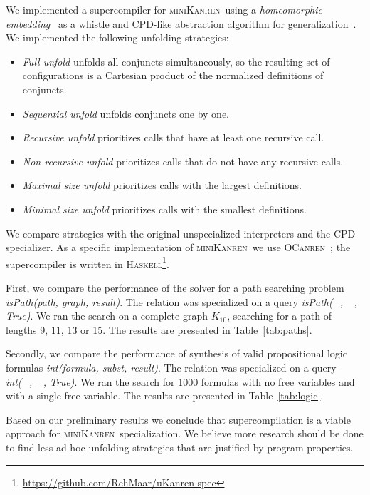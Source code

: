 \documentclass[submission,copyright,creativecommons]{eptcs}
\newcommand{\miniKanren}{\textsc{miniKanren}\ }
\begin{document}
We implemented a supercompiler for \miniKanren using a {\it homeomorphic embedding}~\cite{homeoEmb} as a whistle
and CPD-like abstraction algorithm for generalization~\cite{cpd}.
We implemented the following unfolding strategies:
\begin{itemize}
\item {\it Full unfold} unfolds all conjuncts simultaneously, so
      the resulting set of configurations is a Cartesian product of the normalized definitions of conjuncts.
\item {\it Sequential unfold} unfolds conjuncts one by one.
\item {\it Recursive unfold}     prioritizes calls that have at least one recursive call.
\item {\it Non-recursive unfold} prioritizes calls that do not have any recursive calls.
\item {\it Maximal size unfold}  prioritizes calls with the largest definitions.
\item {\it Minimal size unfold}  prioritizes calls with the smallest definitions.
\end{itemize}

We compare strategies with the original unspecialized interpreters and the CPD specializer.
As a specific implementation of \miniKanren we use \textsc{OCanren}~\cite{ocanren};
the supercompiler is written in \textsc{Haskell}\footnote{\url{https://github.com/RehMaar/uKanren-spec}}.

First, we compare the performance of the solver for a path searching problem \textit{isPath(path, graph, result)}.
The relation was specialized on a query \textit{isPath(_, _, True)}.
We ran the search on a complete graph $K_{10}$, searching for a path of lengths 9, 11, 13 or 15.
The results are presented in Table~\ref{tab:paths}.

Secondly, we compare the performance of synthesis of valid propositional logic formulas \textit{int(formula, subst, result)}.
The relation was specialized on a query \textit{int(_, _, True)}.
We ran the search for 1000 formulas with no free variables and with a single free variable.
The results are presented in Table~\ref{tab:logic}.

Based on our preliminary results we conclude that supercompilation is a viable approach for \miniKanren specialization.
We believe more research should be done to find less ad hoc unfolding strategies that are justified by program properties.
\end{document}
